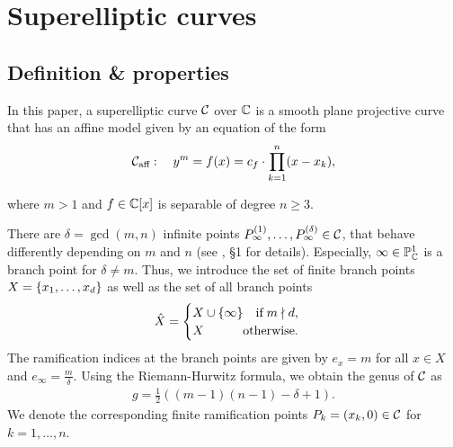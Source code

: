 \documentclass[main.tex]{subfiles}
\begin{document}
  \section{Superelliptic curves}\label{sec:se_curves}

  \subsection{Definition \& properties}\label{subsec:se_def}

    \begin{defn}\label{def:se_curve}
    In this paper, a superelliptic curve $\mathcal{C}$ over $\mathbb{C}$ is a smooth plane projective curve that has an affine model given by an equation of the form
   \begin{align}\label{eq:aff_model}
    \mathcal{C}_{\text{aff}} : \quad y^m = f(x) =  c_f \cdot \prod_{k=1}^n (x-x_k),
   \end{align}
   \end{defn}
   where $m > 1$ and $f \in \mathbb{C}[x]$ is separable of degree $n \ge 3$.

  There are $\delta = \gcd(m,n)$ infinite points $P_{\infty}^{(1)},\dots,P_{\infty}^{(\delta)} \in \mathcal{C}$, that behave differently depending on $m$ and $n$ (see \cite{CT1996}, \S 1 for details).
  Especially, $\infty \in \mathbb{P}^1_{\mathbb{C}}$ is a branch point for $\delta \ne m$. Thus, we introduce the set of finite branch points $X = \{ x_1,\dots,x_d \}$ as well as the set of all branch points
  \begin{align}\label{eq:branch_points}
         \hat{X} = \begin{cases}   X \cup \{ \infty \} \quad \text{if} \; m  \nmid  d,\\
         X \hfill \text{otherwise.}
     \end{cases}
  \end{align}
  The ramification indices at the branch points are given by $e_x = m$ for all $x \in X$ and $e_{\infty} = \frac{m}{\delta}$. Using the
  Riemann-Hurwitz formula, we obtain the genus of $\mathcal{C}$ as
  \begin{align}\label{eq:genus}
    g = \frac{1}{2}( (m-1)(n-1) - \delta + 1).
  \end{align}
  We denote the corresponding finite ramification points $P_k = (x_k,0) \in \mathcal{C}$ for $k = 1,\dots,n$.
  
\end{document}
